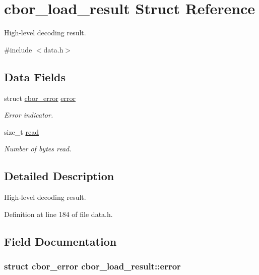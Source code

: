 \hypertarget{structcbor__load__result}{\section{cbor\-\_\-load\-\_\-result Struct Reference}
\label{structcbor__load__result}
}


High-\/level decoding result.  




{\ttfamily \#include $<$data.\-h$>$}

\subsection*{Data Fields}
\begin{DoxyCompactItemize}
\item 
struct \hyperlink{structcbor__error}{cbor\-\_\-error} \hyperlink{structcbor__load__result_af23777116487150fb1b06842fc57724f}{error}
\begin{DoxyCompactList}\small\item\em Error indicator. \end{DoxyCompactList}\item 
size\-\_\-t \hyperlink{structcbor__load__result_ac5d6290cac5893bd060f6759beef2b28}{read}
\begin{DoxyCompactList}\small\item\em Number of bytes read. \end{DoxyCompactList}\end{DoxyCompactItemize}


\subsection{Detailed Description}
High-\/level decoding result. 

Definition at line 184 of file data.\-h.



\subsection{Field Documentation}
\hypertarget{structcbor__load__result_af23777116487150fb1b06842fc57724f}{
\subsubsection[{error}]{\setlength{\rightskip}{0pt plus 5cm}struct {\bf cbor\-\_\-error} cbor\-\_\-load\-\_\-result\-::error}}\label{structcbor__load__result_af23777116487150fb1b06842fc57724f}



